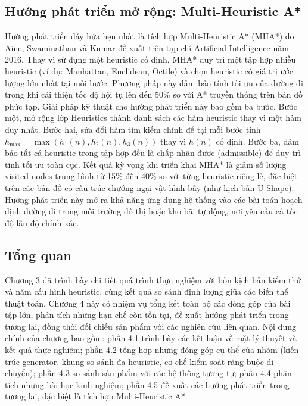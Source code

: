 \documentclass[../BTL.tex]{subfiles}
\begin{document}
\subsection{Hướng phát triển mở rộng: Multi-Heuristic A*}
\label{section:4.5.2}

Hướng phát triển đầy hứa hẹn nhất là tích hợp Multi-Heuristic A* (MHA*) do Aine, Swaminathan và Kumar đề xuất trên tạp chí Artificial Intelligence năm 2016. Thay vì sử dụng một heuristic cố định, MHA* duy trì một tập hợp nhiều heuristic (ví dụ: Manhattan, Euclidean, Octile) và chọn heuristic có giá trị ước lượng lớn nhất tại mỗi bước. Phương pháp này đảm bảo tính tối ưu của đường đi trong khi cải thiện tốc độ hội tụ lên đến 50\% so với A* truyền thống trên bản đồ phức tạp. Giải pháp kỹ thuật cho hướng phát triển này bao gồm ba bước. Bước một, mở rộng lớp Heuristics thành danh sách các hàm heuristic thay vì một hàm duy nhất. Bước hai, sửa đổi hàm tìm kiếm chính để tại mỗi bước tính \(h_{\max} = \max(h_1(n), h_2(n), h_3(n))\) thay vì \(h(n)\) cố định. Bước ba, đảm bảo tất cả heuristic trong tập hợp đều là chấp nhận được (admissible) để duy trì tính tối ưu toàn cục. Kết quả kỳ vọng khi triển khai MHA* là giảm số lượng visited nodes trung bình từ 15\% đến 40\% so với từng heuristic riêng lẻ, đặc biệt trên các bản đồ có cấu trúc chướng ngại vật hình bẫy (như kịch bản U-Shape). Hướng phát triển này mở ra khả năng ứng dụng hệ thống vào các bài toán hoạch định đường đi trong môi trường đô thị hoặc kho bãi tự động, nơi yêu cầu cả tốc độ lẫn độ chính xác.

\subsection*{Tổng quan}

Chương 3 đã trình bày chi tiết quá trình thực nghiệm với bốn kịch bản kiểm thử và năm cấu hình heuristic, cùng kết quả so sánh định lượng giữa các biến thể thuật toán. Chương 4 này có nhiệm vụ tổng kết toàn bộ các đóng góp của bài tập lớn, phân tích những hạn chế còn tồn tại, đề xuất hướng phát triển trong tương lai, đồng thời đối chiếu sản phẩm với các nghiên cứu liên quan. Nội dung chính của chương bao gồm: phần 4.1 trình bày các kết luận về mặt lý thuyết và kết quả thực nghiệm; phần 4.2 tổng hợp những đóng góp cụ thể của nhóm (kiến trúc generator, khung so sánh đa heuristic, cơ chế kiểm soát ràng buộc di chuyển); phần 4.3 so sánh sản phẩm với các hệ thống tương tự; phần 4.4 phân tích những bài học kinh nghiệm; phần 4.5 đề xuất các hướng phát triển trong tương lai, đặc biệt là tích hợp Multi-Heuristic A*.
\end{document}
